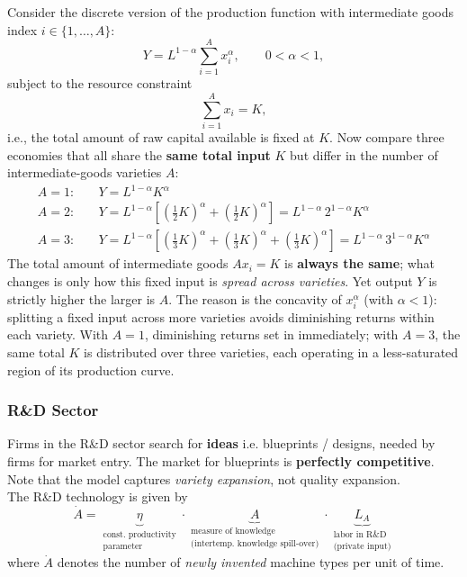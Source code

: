 \begin{tcolorbox}[
    colback=blue!1!white,
    colframe=blue!40!white,
    title=The Role of $A$: Returns to Specialization,
    fonttitle=\bfseries
    ]
Consider the discrete version of the production function with intermediate goods index $i \in \{1, \dots, A\}$:
\[
    Y = L^{1-\alpha} \sum_{i=1}^{A} x_i^\alpha, \qquad 0 < \alpha < 1,
\]
subject to the resource constraint
\[
    \sum_{i=1}^{A} x_i = K,
\]
i.e., the total amount of raw capital available is fixed at $K$. Now compare three economies that all share the \textbf{same total input} $K$ but differ in the number of intermediate-goods varieties $A$:
\begin{align*}
    A=1: \quad & Y = L^{1-\alpha} K^\alpha \\[2pt]
    A=2: \quad & Y = L^{1-\alpha} \left[ \left(\tfrac{1}{2} K\right)^\alpha + \left(\tfrac{1}{2} K\right)^\alpha \right] = L^{1-\alpha} \, 2^{1-\alpha} K^\alpha \\[2pt]
    A=3: \quad & Y = L^{1-\alpha} \left[ \left(\tfrac{1}{3} K\right)^\alpha + \left(\tfrac{1}{3} K\right)^\alpha + \left(\tfrac{1}{3} K\right)^\alpha \right] = L^{1-\alpha} \, 3^{1-\alpha} K^\alpha
\end{align*}
The total amount of intermediate goods $A x_i = K$ is \textbf{always the same}; what changes is only how this fixed input is \textit{spread across varieties}. Yet output $Y$ is strictly higher the larger is $A$. The reason is the concavity of $x_i^\alpha$ (with $\alpha < 1$): splitting a fixed input across more varieties avoids diminishing returns within each variety. With $A=1$, diminishing returns set in immediately; with $A=3$, the same total $K$ is distributed over three varieties, each operating in a less-saturated region of its production curve.
\end{tcolorbox}


\subsubsection{R\&D Sector}

Firms in the R\&D sector search for \textbf{ideas} i.e. blueprints / designs, needed by firms for market entry. The market for blueprints is \textbf{perfectly competitive}. Note that the model captures \textit{variety expansion}, not quality expansion.
\\

\noindent The R\&D technology is given by
\[
    \dot{A} = \underbrace{\eta}_{\substack{\text{const. productivity}\\\text{parameter}}} \cdot \underbrace{A}_{\substack{\text{measure of knowledge}\\\text{(intertemp. knowledge spill-over)}}} \cdot \underbrace{L_A}_{\substack{\text{labor in R\&D}\\\text{(private input)}}}
\]
where $\dot{A}$ denotes the number of \textit{newly invented} machine types per unit of time.

